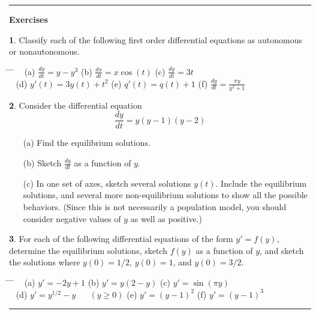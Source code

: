 \documentclass[reqno]{immbook}
\newcommand{\ds}{\displaystyle}
\numberwithin{equation}{chapter}
\numberwithin{question}{section}
\numberwithin{theorem}{chapter}
\numberwithin{figure}{chapter}
\theoremstyle{definition}
\newtheorem{exercise}{}[section]
\newenvironment{exercises}%
{%
\medskip\hrule\medskip\noindent\textbf{Exercises}%
}%
{%
\medskip\hrule
}
\begin{document}
\newpage

\begin{exercises}
\begin{exercise}
Classify each of the following first order differential equations
as autonomous or nonautonomous.

\medskip
\begin{tabbing}
\hspace*{0.25in} \= \hspace*{1.5in} \= \hspace*{1.5in} \= \kill
~ \> 
(a) $\ds \frac{dy}{dt} = y - y^3$ \>
(b) $\ds \frac{dx}{dt} = x\cos(t)$ \>
(c) $\ds \frac{dy}{dt} = 3t$ \\[2pt]
~ \>
(d) $\ds y'(t) = 3y(t) + t^2$ \>
(e) $\ds q'(t) = q(t) + 1$ \>
(f) $\ds \frac{dy}{dt} = \frac{\pi y}{y^2+1}$
\end{tabbing}
\end{exercise}
\begin{exercise}
Consider the differential equation
\[
   \frac{dy}{dt} = y(y-1)(y-2)
\]
\begin{enumerate}
\item[(a)] Find the equilibrium solutions.\\
\item[(b)] Sketch $\frac{dy}{dt}$ as a function of $y$.\\
\item[(c)] In one set of axes, sketch several solutions $y(t)$. Include the equilibrium solutions,
and several more non-equilibrium solutions to show all the possible behaviors.
(Since this is not necessarily a population model, you should consider negative values
of $y$ as well as positive.)
\end{enumerate}
\end{exercise}

\begin{exercise}
For each of the following differential equations
of the form $y' = f(y)$,
determine the equilibrium solutions, sketch $f(y)$ as a function
of $y$, and sketch the solutions where $y(0)=1/2$, $y(0)=1$, and
$y(0)=3/2$.
\begin{tabbing}
\hspace*{0.25in} \= \hspace*{1.75in} \= \hspace*{1.5in} \= \kill
~ \> 
(a) $\ds y' = -2y + 1$ \>
(b) $\ds y' = y(2-y)$ \>
(c) $\ds y' = \sin(\pi y)$ \\[2pt]
~ \>
(d) $\ds y' = y^{1/2} - y$ ~~ $(y \ge 0)$ \>
(e) $\ds y' = (y-1)^2$ \>
(f) $\ds y' = (y-1)^3$
\end{tabbing}
\end{exercise}
\end{exercises}
\end{document}
